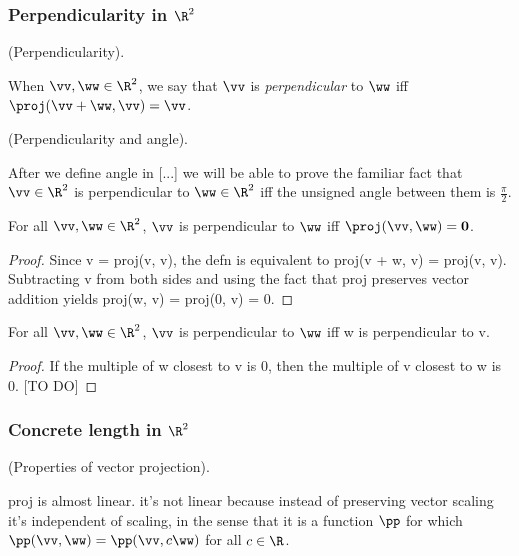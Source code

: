 \subsubsection*{Perpendicularity in $\R^2$}

\begin{defn}
	(Perpendicularity).
	
	When $\vv, \ww \in \R^2$, we say that $\vv$ is \textit{perpendicular} to $\ww$ iff $\proj(\vv + \ww, \vv) = \vv$.
\end{defn}

\begin{remark}
	 (Perpendicularity and angle).
	 
	 After we define angle in [...] we will be able to prove the familiar fact that $\vv \in \R^2$ is perpendicular to $\ww \in \R^2$ iff the unsigned angle between them is $\frac{\pi}{2}$.
\end{remark}

\begin{theorem}
	For all $\vv, \ww \in \R^2$, $\vv$ is perpendicular to $\ww$ iff $\proj(\vv, \ww) = \mathbf{0}$.
\end{theorem}

\begin{proof}
	Since v = proj(v, v), the defn is equivalent to proj(v + w, v) = proj(v, v). Subtracting v from both sides and using the fact that proj preserves vector addition yields proj(w, v) = proj(0, v) = 0.
\end{proof}

\begin{theorem}
	For all $\vv, \ww \in \R^2$, $\vv$ is perpendicular to $\ww$ iff w is perpendicular to v.
\end{theorem}

\begin{proof}
	If the multiple of w closest to v is 0, then the multiple of v closest to w is 0. [TO DO]
\end{proof}

\subsubsection*{Concrete length in $\R^2$}

\begin{theorem}
	(Properties of vector projection).
	
	proj is almost linear. it's not linear because instead of preserving vector scaling it's independent of scaling, in the sense that it is a function $\pp$ for which $\pp(\vv, \ww) = \pp(\vv, c\ww)$ for all $c \in \R$.
\end{theorem}

